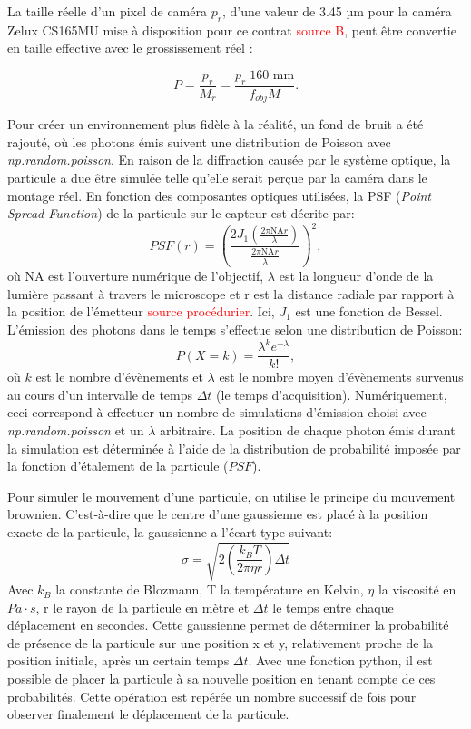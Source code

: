 \documentclass[conference]{IEEEtran}
\begin{document}
La taille réelle d'un pixel de caméra $p_r$, d'une valeur de 3.45 µm pour la caméra Zelux CS165MU
mise à disposition pour ce contrat \textcolor{red}{source B}, peut être convertie en taille effective
avec le grossissement réel :

\begin{equation}\label{pixel}
  P = \frac{p_{r}}{M_{r}} = \frac{p_{r}\;160 \text{ mm}}{f_{obj}M}.
\end{equation}



Pour créer un environnement plus fidèle à la réalité, un fond de bruit
a été rajouté, où les photons émis suivent une distribution de Poisson avec \textit{np.random.poisson}. En raison de la diffraction 
causée par le système optique, la particule a due être simulée
telle qu'elle serait perçue par la caméra dans le montage réel. En fonction des composantes optiques utilisées,
la PSF (\textit{Point Spread Function}) de la particule sur le capteur est décrite par:
\begin{equation}
  PSF(r)=\left(\frac{2J_1(\frac{2\pi \text{NA}r}{\lambda})}{\frac{2\pi \text{NA}r}{\lambda}}\right)^2,
\end{equation}
où NA est l'ouverture numérique de l'objectif, $\lambda$ est la longueur d'onde de la lumière passant à travers
le microscope et r est la distance radiale par rapport à la position de l'émetteur \textcolor{red}{source procédurier}. Ici, $J_1$
est une fonction de Bessel. L'émission des photons dans le temps s'effectue selon une distribution de Poisson:
\begin{equation}
  P(X=k)=\frac{\lambda^k e^{-\lambda}}{k!},
\end{equation}
où $k$ est le nombre d'évènements et $\lambda$ est le nombre moyen d'évènements
survenus au cours d'un intervalle de temps $\Delta t$ (le temps d'acquisition). Numériquement, ceci correspond à effectuer un nombre de simulations
d'émission choisi avec \textit{np.random.poisson} et un $\lambda$ arbitraire. La position de chaque photon
émis durant la simulation est déterminée à l'aide de la distribution de probabilité imposée par la fonction d'étalement 
de la particule ($PSF$).

Pour simuler le mouvement d'une particule, on utilise le principe du mouvement brownien.
C'est-à-dire que le centre d'une gaussienne est placé à la position exacte de la particule,
la gaussienne a l'écart-type suivant:
\begin{equation}
  \sigma =\sqrt{2\left ( \frac{k_{B}T}{2\pi \eta r} \right )\Delta t}
\end{equation}
Avec $k_{B}$ la constante de Blozmann, T la température en Kelvin, $\eta$ la viscosité en $Pa\cdot s$, r le rayon de la particule en mètre et $\Delta t$ le temps entre chaque déplacement en secondes. 
Cette gaussienne permet de déterminer la probabilité de présence de la particule sur une position x et y, relativement proche de la position initiale, après un certain temps $\Delta t$.  Avec une fonction python, 
il est possible de placer la particule à sa nouvelle position en tenant compte de ces probabilités. Cette opération est repérée un nombre successif de fois pour observer finalement 
le déplacement de la particule. 
\end{document}
